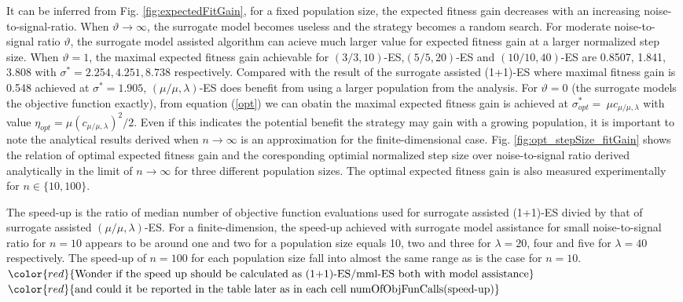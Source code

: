 It can be inferred from Fig. \ref{fig:expectedFitGain}, for a fixed population size, the expected fitness gain decreases with an increasing noise-to-signal-ratio. When $\vartheta \rightarrow \infty$, the surrogate model becomes useless and the strategy becomes a random search. For moderate noise-to-signal ratio $\vartheta$, the surrogate model assisted algorithm can acieve much larger value for expected fitness gain at a larger normalized step size. When $\vartheta = 1$, the maximal expected fitness gain achievable for $(3/3,10)$-ES,$(5/5,20)$-ES and $(10/10,40)$-ES are 0.8507, 1.841, 3.808 with $\sigma^*=2.254,4.251,8.738$ respectively. Compared with the result of the surrogate assisted (1+1)-ES \cite{DBLP:conf/ppsn/KayhaniA18} where maximal fitness gain is 0.548 achieved at $\sigma^* = 1.905$, $(\mu/\mu,\lambda)$-ES does benefit from using a larger population from the analysis. For $\vartheta=0$ (the surrogate models the objective function exactly), from equation (\ref{opt}) we can obatin the maximal expected fitness gain is achieved at $\sigma^*_{opt} = \ \mu c_{\mu / \mu, \lambda}$ with value $\eta_{opt} =  \mu (c_{\mu / \mu, \lambda})^2/2$. Even if this indicates the potential benefit the strategy may gain with a growing population, it is important to note the analytical results derived when $n \rightarrow \infty$ is an approximation for the finite-dimensional case. Fig. \ref{fig:opt_stepSize_fitGain} shows the relation of optimal expected fitness gain and the coresponding optimial normalized step size over noise-to-signal ratio derived analytically in the limit of $n \rightarrow \infty$ for three different population sizes. The optimal expected fitness gain is also measured experimentally for $n \in \{10,100 \}$. 

The speed-up is the ratio of median number of objective function evaluations used for surrogate assisted (1+1)-ES divied by that of surrogate assisted $(\mu/\mu,\lambda)$-ES. For a finite-dimension, the speed-up achieved with surrogate model assistance for small noise-to-signal ratio for $n=10$ appears to be around one and two for a population size equals 10, two and three for $\lambda = 20$, four and five for $\lambda=40$ respectively. The speed-up of $n=100$ for each population size fall into almost the same range as is the case for $n=10$.  
$\color{red}{\text{Wonder if the speed up should be calculated as (1+1)-ES/mml-ES both with model assistance}}$ $ \color{red}{\text{and could it be reported in the table later as in each cell numOfObjFunCalls(speed-up)}}$

